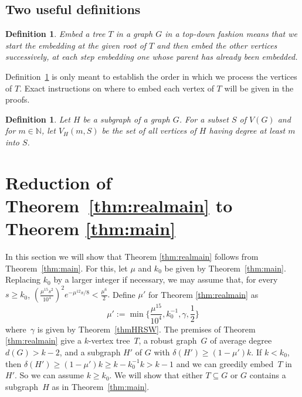 \documentclass[12pt]{article}
\newtheorem{definition}[theorem]{Definition}
\begin{document}
\subsection{Two useful definitions}


\begin{definition}\label{topdown}
Embed a tree $T$ in a graph $G$ in a {\em top-down fashion} means that we start the embedding at the given root of $T$  and then  embed the other vertices successively, at each step embedding one whose parent has already been embedded.
\end{definition}
Definition~\ref{topdown} is only meant to establish the order in which we process the vertices of $T$. Exact instructions on where to embed each vertex of $T$ will be given in the proofs.

\begin{definition}\label{def:VmS}
Let $H$ be a subgraph of  a graph $G$.
For a subset $S$ of $V(G)$ and for $m\in\mathbb N$, let $V_H(m,S)$ be the set of all vertices of $H$ having degree at least $m$ into $S$.
\end{definition}





\section{Reduction of Theorem~\ref{thm:realmain} to Theorem \ref{thm:main}}\label{sec:redu}


In this section we will show that Theorem \ref{thm:realmain} follows from Theorem~\ref{thm:main}.
For this, 
let $\mu$ and $k_0$ be given by Theorem~\ref{thm:main}. Replacing $k_0$ by a larger integer
if necessary, we may assume that, for every $s\ge k_0$,
$(\frac{\mu^{15}s^2}{10^4})^2
e^{-\mu^{12}s/8}<\frac{\mu^6}{2}.$ Define $\mu'$  for Theorem \ref{thm:realmain}  as 
 $$\mu':=\min\Big\{\frac{\mu^{15}}{10^4}, k_{0}^{-1}, \gamma,\frac12\Big\}$$ where~$\gamma$ is given by Theorem~\ref{thmHRSW}. 
The premises of Theorem \ref{thm:realmain} give a $k$-vertex tree~$T$, a robust graph~$G$  of average degree  $d(G)>k-2$, and a subgraph $H'$ of $G$ with 
$\delta(H')\ge (1-\mu')k$. 
If $k<k_0$, then  $\delta(H')\ge (1-\mu')k\ge k- k_{0}^{-1}k> k-1$ and we can greedily embed~$T$  in~$H'$. 
 So we can assume $k\ge k_0$.
We will show that either $T\subseteq G$   or  $G$ contains a subgraph~$H$   as in Theorem~\ref{thm:main}. 
\end{document}
